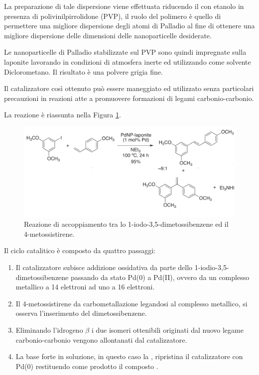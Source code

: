 \documentclass[a4paper, 12pt]{article}
\begin{document}
La preparazione di tale dispersione viene effettuata riducendo il  con etanolo in presenza di polivinilpirrolidone (PVP), il ruolo del polimero è quello di permettere una migliore dispersione degli atomi di Palladio al fine di ottenere una migliore dispersione delle dimensioni delle nanoparticelle desiderate.

Le nanoparticelle di Palladio stabilizzate sul PVP sono quindi impregnate sulla laponite lavorando in condizioni di atmosfera inerte ed utilizzando come solvente Diclorometano. Il risultato è una polvere grigia fine.\cite{martinez_extremely_2015}

Il catalizzatore così ottenuto può essere maneggiato ed utilizzato senza particolari precauzioni in reazioni atte a promuovere formazioni di legami carbonio-carbonio.

La reazione è riassunta nella Figura \ref{fig:h-m_resveratrolo}.

\begin{figure}[H]
	\centering
	\includegraphics[width=\linewidth]{immagini/h-m_resveratrolo.png}
	\caption{Reazione di accoppiamento tra lo 1-iodo-3,5-dimetossibenzene ed il 4-metossistirene.}
	\label{fig:h-m_resveratrolo}
\end{figure}

Il ciclo catalitico è composto da quattro passaggi:
\begin{enumerate}
	\item Il catalizzatore  subisce addizione ossidativa da parte dello 1-iodio-3,5-dimetossibenzene passando da stato Pd(0) a Pd(II), ovvero da un complesso metallico a 14 elettroni ad uno a 16 elettroni.
	\item Il 4-metossistirene da carbometallazione legandosi al complesso metallico, si osserva l'inserimento del dimetossibenzene.
	\item Eliminando l'idrogeno $\beta$ i due isomeri ottenibili originati dal nuovo legame carbonio-carbonio vengono allontanati dal catalizzatore.
	\item La base forte in soluzione, in questo caso la , ripristina il catalizzatore con Pd(0) restituendo come prodotto il composto .
\end{enumerate}
\end{document}

